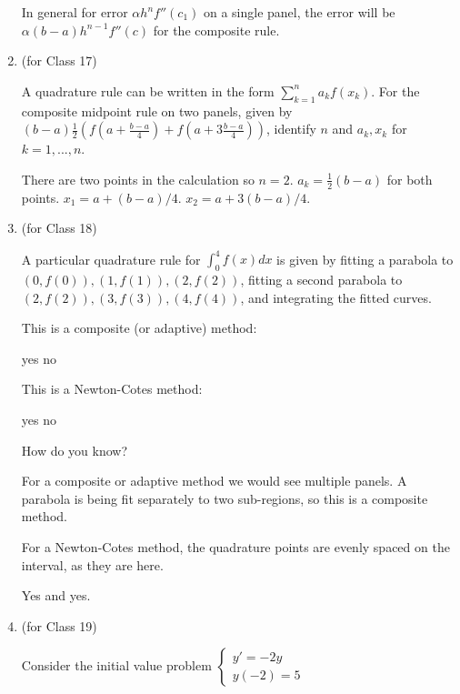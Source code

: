 \documentclass[12pt,letterpaper,answers]{exam}
\begin{document}
\begin{enumerate}
\begin{solution}
In general for error $\alpha h^nf''(c_1)$ on a single panel, the error will be $\alpha (b-a)h^{n-1}f''(c)$ for the composite rule.
\end{solution}

\item (for Class 17)

A quadrature rule can be written in the form $\sum\limits_{k=1}^n a_k f(x_k)$. For the composite midpoint rule on two panels, given by $(b-a)\frac{1}{2}\left(f(a + \frac{b-a}{4})+ f(a + 3\frac{b-a}{4})\right)$, identify $n$ and $a_k, x_k$ for $k=1,...,n$.


\begin{solution}
There are two points in the calculation so $n = 2$.
$a_k = \frac{1}{2}(b-a)$ for both points.  $x_1 = a+(b-a)/4$. $x_2 = a+3(b-a)/4$.
\end{solution}


\item (for Class 18)

A particular quadrature rule for $\displaystyle\int_0^4f(x)dx$ is given by fitting a parabola to $(0,f(0)), (1,f(1)), (2,f(2))$, fitting a second parabola to $(2,f(2)), (3,f(3)), (4,f(4))$, and integrating the fitted curves.

This is a composite (or adaptive) method:
\begin{oneparchoices}
\choice yes \choice no
\end{oneparchoices}

This is a Newton-Cotes method:
\begin{oneparchoices}
\choice yes \choice no
\end{oneparchoices}

How do you know?

\begin{solution}
For a composite or adaptive method we would see multiple panels.  A parabola is being fit separately to two sub-regions, so this is a composite method.  

For a Newton-Cotes method, the quadrature points are evenly spaced on the interval, as they are here.

Yes and yes.
\end{solution}


\item (for Class 19)

Consider the initial value problem $\left\{\begin{array}{l}
y' = -2y \\
y(-2) = 5
\end{array}
\right.$


\end{enumerate}
\end{document}
